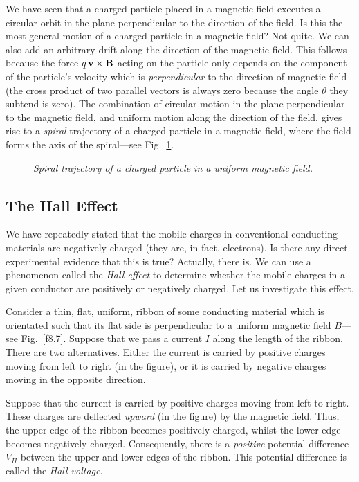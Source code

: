 We have seen that a charged particle placed in a magnetic field  executes a
circular orbit in the plane perpendicular to the direction of the field. 
Is this the most general motion of a charged particle in a magnetic field?
Not quite. We can also add an arbitrary drift along the direction
of the magnetic field. This follows because the force $q\,{\bf v}\times{\bf B}$
acting on the particle only depends on the component of the particle's velocity
which is {\em perpendicular} to the direction of magnetic field (the cross
product of two parallel vectors is always zero because the angle $\theta$
they subtend is zero). The combination of circular motion in the
plane perpendicular to the magnetic field, and uniform motion along the
direction of the 
field, gives rise to a {\em spiral}\/ trajectory of a charged particle in
a magnetic field, where the field forms the axis of the spiral---see Fig.~\ref{f8.6}.

\begin{figure}
\centerline{}
\caption{\em Spiral trajectory of a charged particle in a uniform magnetic field.}\label{f8.6}
\end{figure}

\subsection{The Hall Effect}
We have repeatedly stated that the mobile charges in
conventional
 conducting materials are negatively charged (they are, in fact, electrons).
Is there any direct experimental evidence that this is true? Actually, there is. We can
use a phenomenon called the {\em Hall effect} to determine whether the
mobile charges in a given conductor are positively or negatively charged. 
Let us investigate this effect. 

Consider a thin, flat,  uniform, ribbon of some conducting material which
is orientated such that its flat side is perpendicular to a uniform
magnetic field $B$---see Fig.~\ref{f8.7}. Suppose that we pass a current $I$ along the length
of the ribbon. There are two alternatives. Either the current
is carried by positive charges 
 moving from left to right (in the figure),
or it is carried by negative charges moving in the opposite direction. 

Suppose that the
 current is carried by positive charges moving from left to right.
These charges are deflected
{\em upward}\/ (in the figure) by the magnetic field. Thus, the upper edge of the ribbon becomes
positively            charged, whilst the lower edge becomes negatively charged.
Consequently, there is a {\em positive}\/ potential difference $V_H$ between the upper
and lower edges of the ribbon. This potential difference is called the {\em
Hall voltage}. 

